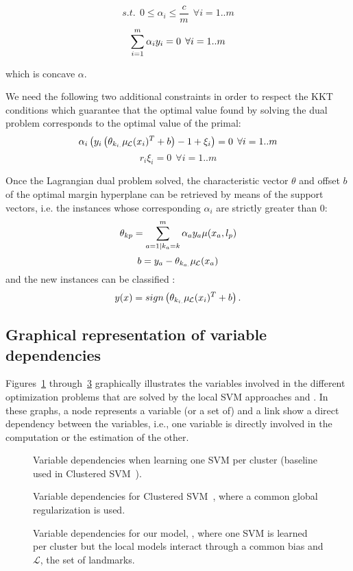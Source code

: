 $$ s.t. \:\: 0 \leq \alpha_i \leq \frac{c}{m} \:\: \forall i=1..m$$
$$ \sum_{i=1}^m \alpha_i y_i = 0 \:\: \forall i=1..m$$

which is concave \wrt $\alpha$.

We need the following two additional constraints in order to respect the KKT conditions which guarantee that the optimal value found by solving the dual problem corresponds to the optimal value of the primal:
$$\alpha_i \left( y_i \left(\theta_{k_{i.}} \mul{x_i}^T + b \right) -1 + \xi_i \right) = 0 \:\: \forall i=1..m$$
$$r_i \xi_i = 0 \:\: \forall i=1..m$$

Once the Lagrangian dual problem solved, the characteristic vector $\theta$ and offset $b$ of the optimal margin hyperplane can be retrieved by means of the support vectors, i.e. the instances whose corresponding $\alpha_i$ are strictly greater than $0$:
$$\theta_{kp} = \sum_{a=1 | k_{a}=k}^m \alpha_a y_a \mu(x_a,l_p)$$
$$b = y_a - \theta_{k_{a.}} \mul{x_a}$$
and the new instances can be classified :
$$y(x) = sign \left( \theta_{k_{i.}} \mul{x_i}^T + b \right).$$ 


\subsection{Graphical representation of variable dependencies}
\label{an:graphicalmodels}

Figures~\ref{fig:gm-svmpercluster} through~\ref{fig:gm-oursvm} graphically illustrates the variables involved in the different optimization problems that are solved by the local SVM approaches and \landSVM.
In these graphs, a node represents a variable (or a set of) and a link show a direct dependency between the variables, i.e., one variable is directly involved in the computation or the estimation of the other. 

\begin{figure}[h!]
  \centering
  
  \caption{Variable dependencies when learning one SVM per cluster (baseline used in Clustered SVM~\cite{gu2013clustered}).}
  \label{fig:gm-svmpercluster}
\end{figure}

\begin{figure}[h!]
  \centering
  
  \caption{Variable dependencies for Clustered SVM~\cite{gu2013clustered}, where a common global regularization is used.}
  \label{fig:gm-clusteredsvm}
\end{figure}

\begin{figure}[h!]
  \centering
  
  \caption{Variable dependencies for our model, \landSVM, where one SVM is learned per cluster but the local models interact through a common bias and $\mathcal{L}$, the set of landmarks.}
  \label{fig:gm-oursvm}
\end{figure}
